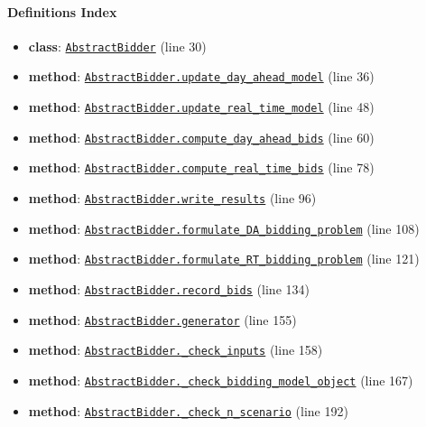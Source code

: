\documentclass[11pt]{report}
\begin{document}
\paragraph{Definitions Index}
\begin{itemize}[leftmargin=*]
  \item \textbf{class}: \hyperref[def:bidder.py:AbstractBidder:L30]{\texttt{AbstractBidder}} (line 30)
  \item \textbf{method}: \hyperref[def:bidder.py:AbstractBidder.update_day_ahead_model:L36]{\texttt{AbstractBidder.update\_day\_ahead\_model}} (line 36)
  \item \textbf{method}: \hyperref[def:bidder.py:AbstractBidder.update_real_time_model:L48]{\texttt{AbstractBidder.update\_real\_time\_model}} (line 48)
  \item \textbf{method}: \hyperref[def:bidder.py:AbstractBidder.compute_day_ahead_bids:L60]{\texttt{AbstractBidder.compute\_day\_ahead\_bids}} (line 60)
  \item \textbf{method}: \hyperref[def:bidder.py:AbstractBidder.compute_real_time_bids:L78]{\texttt{AbstractBidder.compute\_real\_time\_bids}} (line 78)
  \item \textbf{method}: \hyperref[def:bidder.py:AbstractBidder.write_results:L96]{\texttt{AbstractBidder.write\_results}} (line 96)
  \item \textbf{method}: \hyperref[def:bidder.py:AbstractBidder.formulate_DA_bidding_problem:L108]{\texttt{AbstractBidder.formulate\_DA\_bidding\_problem}} (line 108)
  \item \textbf{method}: \hyperref[def:bidder.py:AbstractBidder.formulate_RT_bidding_problem:L121]{\texttt{AbstractBidder.formulate\_RT\_bidding\_problem}} (line 121)
  \item \textbf{method}: \hyperref[def:bidder.py:AbstractBidder.record_bids:L134]{\texttt{AbstractBidder.record\_bids}} (line 134)
  \item \textbf{method}: \hyperref[def:bidder.py:AbstractBidder.generator:L155]{\texttt{AbstractBidder.generator}} (line 155)
  \item \textbf{method}: \hyperref[def:bidder.py:AbstractBidder._check_inputs:L158]{\texttt{AbstractBidder.\_check\_inputs}} (line 158)
  \item \textbf{method}: \hyperref[def:bidder.py:AbstractBidder._check_bidding_model_object:L167]{\texttt{AbstractBidder.\_check\_bidding\_model\_object}} (line 167)
  \item \textbf{method}: \hyperref[def:bidder.py:AbstractBidder._check_n_scenario:L192]{\texttt{AbstractBidder.\_check\_n\_scenario}} (line 192)

\end{itemize}
\end{document}
